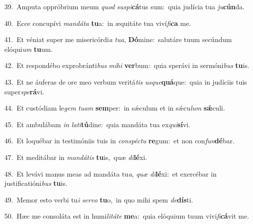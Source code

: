 {\numbfont\textcolor{\numbcolor}{39.}}~Amputa oppróbrium meum \textit{quod} \textit{su}\-\textit{spi}\textbf{cá}tus sum:~\star quia judícia tua \textit{ju}\-\textbf{cún}da.\par
{\numbfont\textcolor{\numbcolor}{40.}}~Ecce concupívi \textit{man}\-\textit{dá}\textit{ta} \textbf{tu}\-a:~\star in æquitáte tua viví\-\textit{fi}\-\textbf{ca} me.\par
{\numbfont\textcolor{\numbcolor}{41.}}~Et véniat super me misericórdi\textit{a} \textit{tu}\-\textit{a}, \textbf{Dó}\-mine:~\star salutáre tuum secúndum elóqui\textit{um} \textbf{tu}\-um.\par
{\numbfont\textcolor{\numbcolor}{42.}}~Et respondébo exprobránti\textit{bus} \textit{mi}\-\textit{hi} \textbf{ver}\-bum:~\star quia sperávi in sermóni\textit{bus} \textbf{tu}\-is.\par
{\numbfont\textcolor{\numbcolor}{43.}}~Et ne áuferas de ore meo verbum veritá\textit{tis} \textit{us}\-\textit{que}\textbf{quá}que:~\star quia in judíciis tuis super\-\textit{spe}\-\textbf{rá}vi.\par
{\numbfont\textcolor{\numbcolor}{44.}}~Et custódiam le\textit{gem} \textit{tu}\-\textit{am} \textbf{sem}\-per:~\star in sǽculum et in sǽcu\textit{lum} \textbf{sǽ}\-culi.\par
{\numbfont\textcolor{\numbcolor}{45.}}~Et ambulábam \textit{in} \textit{la}\-\textit{ti}\textbf{tú}dine:~\star quia mandáta tua ex\-\textit{qui}\-\textbf{sí}vi.\par
{\numbfont\textcolor{\numbcolor}{46.}}~Et loquébar in testimóniis tuis in \textit{con}\-\textit{spéc}\textit{tu} \textbf{re}\-gum:~\star et non con\-\textit{fun}\-\textbf{dé}bar.\par
{\numbfont\textcolor{\numbcolor}{47.}}~Et meditábar in \textit{man}\-\textit{dá}\textit{tis} \textbf{tu}\-is,~\star quæ \textit{di}\-\textbf{lé}xi.\par
{\numbfont\textcolor{\numbcolor}{48.}}~Et levávi manus meas ad mandáta tu\-\textit{a}\-, \textit{quæ} \textit{di}\-\textbf{lé}xi:~\star et exercébar in justificatióni\textit{bus} \textbf{tu}\-is.\par
{\numbfont\textcolor{\numbcolor}{49.}}~Memor esto verbi tu\textit{i} \textit{ser}\-\textit{vo} \textbf{tu}\-o,~\star in quo mihi spem \textit{de}\-\textbf{dís}ti.\par
{\numbfont\textcolor{\numbcolor}{50.}}~Hæc me consoláta est in humi\-\textit{li}\-\textit{tá}\textit{te} \textbf{me}\-a:~\star quia elóquium tuum vivi\-\textit{fi}\-\textbf{cá}vit me.\par
